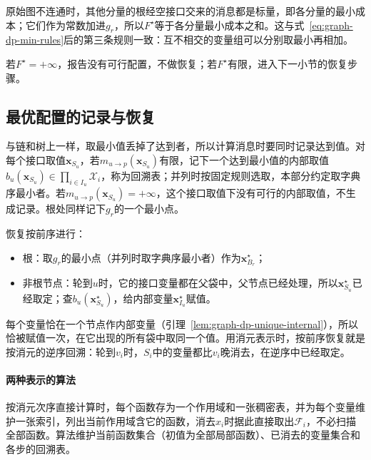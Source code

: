 原始图不连通时，其他分量的根经空接口交来的消息都是标量，即各分量的最小成本；它们作为常数加进$g_r$，所以$F^\star$等于各分量最小成本之和。这与式~\eqref{eq:graph-dp-min-rules}后的第三条规则一致：互不相交的变量组可以分别取最小再相加。

若$F^\star=+\infty$，报告没有可行配置，不做恢复；若$F^\star$有限，进入下一小节的恢复步骤。

\subsection{最优配置的记录与恢复}
\label{sec:graph-dp-min-cost-recovery}
\label{sec:graph-dp-bag-algorithm}
\label{sec:graph-dp-elimination-algorithm}

与链和树上一样，取最小值丢掉了达到者，所以计算消息时要同时记录达到值。对每个接口取值$\bm x_{S_u}$，若$m_{u\to p}(\bm x_{S_u})$有限，记下一个达到最小值的内部取值$b_u(\bm x_{S_u})\in\prod_{i\in I_u}\mathcal X_i$，称为回溯表；并列时按固定规则选取，本部分约定取字典序最小者。若$m_{u\to p}(\bm x_{S_u})=+\infty$，这个接口取值下没有可行的内部取值，不生成记录。根处同样记下$g_r$的一个最小点。

恢复按前序进行：
\begin{itemize}
  \item 根：取$g_r$的最小点（并列时取字典序最小者）作为$\bm x^\star_{B_r}$；
  \item 非根节点：轮到$u$时，它的接口变量都在父袋中，父节点已经处理，所以$\bm x^\star_{S_u}$已经取定；查$b_u(\bm x^\star_{S_u})$，给内部变量$\bm x^\star_{I_u}$赋值。
\end{itemize}
每个变量恰在一个节点作内部变量（引理~\ref{lem:graph-dp-unique-internal}），所以恰被赋值一次，在它出现的所有袋中取同一个值。用消元表示时，按前序恢复就是按消元的逆序回溯：轮到$v_i$时，$S_i$中的变量都比$v_i$晚消去，在逆序中已经取定。

\paragraph{两种表示的算法}
按消元次序直接计算时，每个函数存为一个作用域和一张稠密表，并为每个变量维护一张索引，列出当前作用域含它的函数，消去$x_i$时据此直接取出$\mathcal F_i$，不必扫描全部函数。算法维护当前函数集合（初值为全部局部函数）、已消去的变量集合和各步的回溯表。

